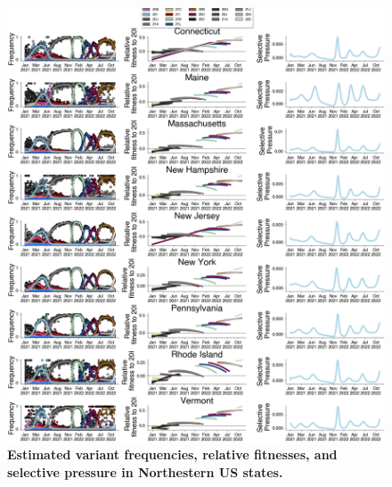 \documentclass[11pt,oneside,letterpaper]{article}
\begin{document}
\begin{figure}[t!]
    \centering
    \includegraphics[width=1.0\textwidth=0.01]{./supplementary_figures/selective-pressure-analysis_Northeast.png}
    \caption{
      \textbf{Estimated variant frequencies, relative fitnesses, and selective pressure in Northestern US states.}
    }
    \label{fig:selective_pressure_northeast}
\end{figure}
\end{document}
